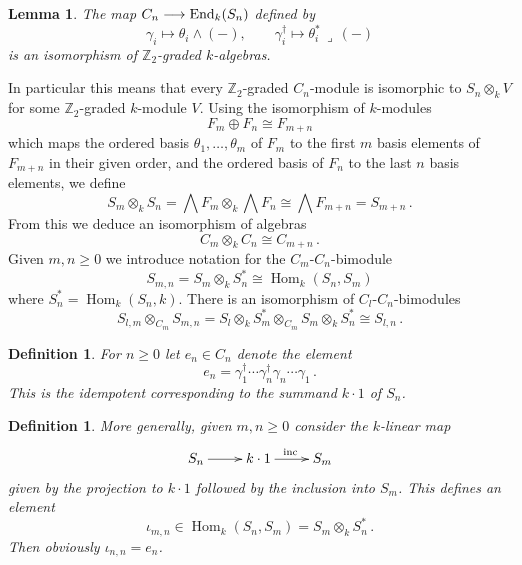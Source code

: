\documentclass[english,letter paper,12pt,leqno]{article}
\newtheorem{lemma}[theorem]{Lemma}
\theoremstyle{example}
\newtheorem{definition}[theorem]{Definition}
\numberwithin{equation}{section}
\def\Hom{\operatorname{Hom}}
\DeclareMathOperator{\End}{End}
\begin{document}
\begin{lemma}\label{defn:spinorrep} The map $C_n \lto \End_k(S_n)$ defined by
\[
\gamma_i \mapsto \theta_i \wedge (-), \qquad \gamma_i^\dagger \mapsto \theta_i^*\, \lrcorner\, (-)
\]
is an isomorphism of $\mathbb{Z}_2$-graded $k$-algebras.
\end{lemma}

In particular this means that every $\mathbb{Z}_2$-graded $C_n$-module is isomorphic to $S_n \otimes_k V$ for some $\mathbb{Z}_2$-graded $k$-module $V$. Using the isomorphism of $k$-modules
\[
F_m \oplus F_n \cong F_{m+n}
\]
which maps the ordered basis $\theta_1,\ldots,\theta_m$ of $F_m$ to the first $m$ basis elements of $F_{m+n}$ in their given order, and the ordered basis of $F_n$ to the last $n$ basis elements, we define
\[
S_m \otimes_k S_n = \bigwedge F_m \otimes_k \bigwedge F_n \cong \bigwedge F_{m+n} = S_{m+n}\,.
\]
From this we deduce an isomorphism of algebras
\begin{equation}\label{eq:algebra_A_additive}
C_m \otimes_k C_n \cong C_{m+n}\,.
\end{equation}
Given $m, n \ge 0$ we introduce notation for the $C_m$-$C_n$-bimodule
\begin{equation}
S_{m,n} = S_m \otimes_k S_n^* \cong \Hom_k(S_n,S_m)
\end{equation}
where $S_n^* = \Hom_k(S_n, k)$. There is an isomorphism of $C_l$-$C_n$-bimodules
\begin{equation}\label{eq:isosbimodule}
S_{l,m} \otimes_{C_m} S_{m,n} = S_l \otimes_k S_m^* \otimes_{C_m} S_m \otimes_k S_n^* \cong S_{l,n}\,.
\end{equation}

\begin{definition}\label{defn:idempotent_e} For $n \ge 0$ let $e_n \in C_n$ denote the element
\[
e_n = \gamma_1^\dagger \cdots \gamma_n^\dagger \gamma_n \cdots \gamma_1\,.
\]
This is the idempotent corresponding to the summand $k \cdot 1$ of $S_n$.
\end{definition}

\begin{definition}\label{defn:idempotent_gen} More generally, given $m, n \ge 0$ consider the $k$-linear map
\[
\xymatrix{
S_n \ar[r] & k \cdot 1 \ar[r]^{\operatorname{inc}} & S_m
}
\]
given by the projection to $k \cdot 1$ followed by the inclusion into $S_m$. This defines an element
\[
\iota_{m,n} \in \Hom_k(S_n, S_m) = S_m \otimes_k S_n^*\,.
\]
Then obviously $\iota_{n,n} = e_n$.
\end{definition}
\end{document}
